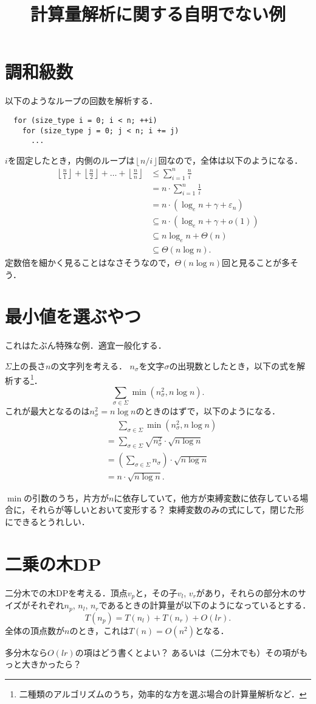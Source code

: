 \documentclass{jsarticle}
\title{計算量解析に関する自明でない例}
\newcommand{\floor}[1]{\left\lfloor #1\right\rfloor}
\begin{document}
\maketitle

\section{調和級数}

以下のようなループの回数を解析する．
\begin{verbatim}
  for (size_type i = 0; i < n; ++i)
    for (size_type j = 0; j < n; i += j)
      ...
\end{verbatim}
$i$を固定したとき，内側のループは$\floor{n/i}$回なので，全体は以下のようになる．
\begin{align*}
  \floor{\frac{n}{1}}+\floor{\frac{n}{2}}+\dots+\floor{\frac{n}{n}}
  &\le \sum_{i=1}^n \frac{n}{i}\\
  &= n\cdot\sum_{i=1}^n \frac{1}{i}\\
  &= n\cdot(\log_e n+\gamma+\varepsilon_n)\\
  &\subseteq n\cdot(\log_e n+\gamma+o(1))\\
  &\subseteq n\log_e n+\Theta(n)\\
  &\subseteq \Theta(n\log n).
\end{align*}
定数倍を細かく見ることはなさそうなので，$\Theta(n\log n)$回と見ることが多そう．

\section{最小値を選ぶやつ}

これはたぶん特殊な例．適宜一般化する．

$\Sigma$上の長さ$n$の文字列を考える．
$n_\sigma$を文字$\sigma$の出現数としたとき，以下の式を解析する\footnote{二種類のアルゴリズムのうち，効率的な方を選ぶ場合の計算量解析など．}．
\[
\sum_{\sigma\in\Sigma} \min(n_\sigma^2, n\log n).
\]
これが最大となるのは$n_\sigma^2 = n\log n$のときのはずで，以下のようになる．
\begin{align*}
  &\phantom{{}={}}\sum_{\sigma\in\Sigma} \min(n_\sigma^2, n\log n)\\
  &= \sum_{\sigma\in\Sigma}\sqrt{n_\sigma^2}\cdot\sqrt{n\log n}\\
  &= \left(\sum_{\sigma\in\Sigma}n_\sigma\right)\cdot\sqrt{n\log n}\\
  &= n\cdot\sqrt{n\log n}.
\end{align*}

$\min$の引数のうち，片方が$n$に依存していて，他方が束縛変数に依存している場合に，それらが等しいとおいて変形する？ 束縛変数のみの式にして，閉じた形にできるとうれしい．

\section{二乗の木DP}

二分木での木DPを考える．頂点$v_p$と，その子$v_l$, $v_r$があり，それらの部分木のサイズがそれぞれ$n_p$, $n_l$, $n_r$であるときの計算量が以下のようになっているとする．
\[T(n_p) = T(n_l)+T(n_r)+O(lr).\]
全体の頂点数が$n$のとき，これは$T(n) = O(n^2)$となる．

多分木なら$O(lr)$の項はどう書くとよい？ あるいは（二分木でも）その項がもっと大きかったら？
\end{document}
